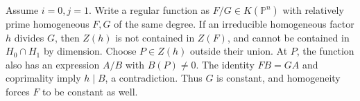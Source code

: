 Assume $i=0,j=1$. Write a regular function as $F/G\in K(\mathbb P^n)$ with relatively prime homogeneous $F,G$ of the same degree. If an irreducible homogeneous factor $h$ divides $G$, then $Z(h)$ is not contained in $Z(F)$, and cannot be contained in $H_0\cap H_1$ by dimension. Choose $P\in Z(h)$ outside their union. At $P$, the function also has an expression $A/B$ with $B(P)\ne0$. The identity $FB=GA$ and coprimality imply $h\mid B$, a contradiction. Thus $G$ is constant, and homogeneity forces $F$ to be constant as well.
